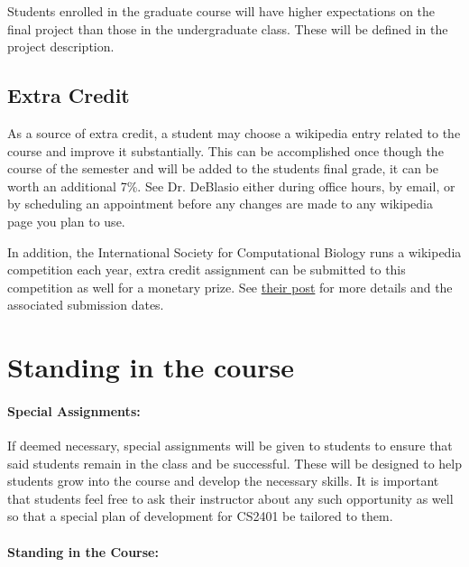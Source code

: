 \documentclass[12pt]{scrartcl}
\begin{document}
Students enrolled in the graduate course will have higher expectations on the final project than those in the undergraduate class. 
These will be defined in the project description. 

\subsection{Extra Credit}
As a source of extra credit, a student may choose a wikipedia entry related to the course and improve it substantially. 
This can be accomplished once though the course of the semester and will be added to the students final grade, it can be worth an additional 7\%. 
See Dr. DeBlasio either during office hours, by email, or by scheduling an appointment before any changes are made to any wikipedia page you plan to use.

In addition, the International Society for Computational Biology runs a wikipedia competition each year, 
extra credit assignment can be submitted to this competition as well for a monetary prize. 
See \href{https://en.wikipedia.org/wiki/Wikipedia:WikiProject_Molecular_Biology/Computational_Biology/10th_ISCB_Wikipedia_competition_announcement} {their post} 
for more details and the associated submission dates. 

\section{Standing in the course}

\paragraph{Special Assignments:} 
If deemed necessary, special assignments will be given to students to ensure that said students remain in the class and be successful. 
These will be designed to help students grow into the course and develop the necessary skills.
It is important that students feel free to ask their instructor about any such opportunity as well so that a special plan of development for CS2401 be tailored to them.

\paragraph{Standing in the Course:} 
\end{document}
